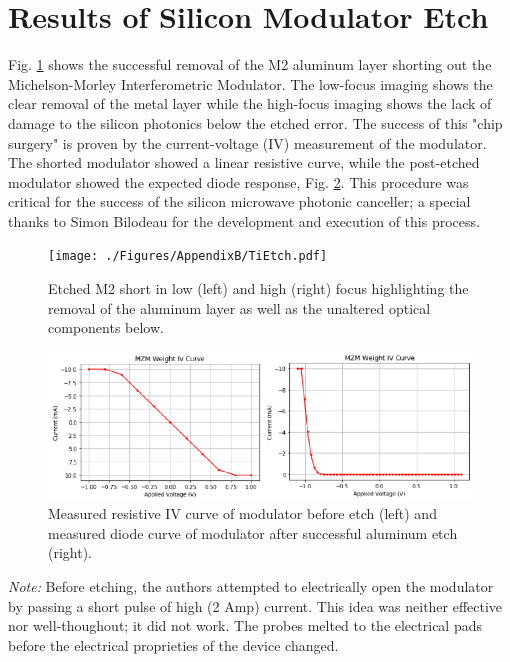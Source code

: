 \section{Results of Silicon Modulator Etch}
\qquad Fig. \ref{FigAppB4} shows the successful removal of the M2 aluminum layer shorting out the Michelson-Morley Interferometric Modulator. The low-focus imaging shows the clear removal of the metal layer while the high-focus imaging shows the lack of damage to the silicon photonics below the etched error. The success of this "chip surgery" is proven by the current-voltage (IV) measurement of the modulator. The shorted modulator showed a linear resistive curve, while the post-etched modulator showed the expected diode response, Fig. \ref{FigAppB5}. This procedure was critical for the success of the silicon microwave photonic canceller; a special thanks to Simon Bilodeau for the development and execution of this process. 

\begin{figure}[!htbp]
\centering
\texttt{[image: ./Figures/AppendixB/TiEtch.pdf]}
\caption[Imaging of successful etch in varying imaging focus to highlight different chip depths.]{Etched M2 short in low (left) and high (right) focus highlighting the removal of the aluminum layer as well as the unaltered optical components below.}
\label{FigAppB4}
\end{figure}

\begin{figure}[!htbp]
\centering
\includegraphics[width=5.5in]{./Figures/AppendixB/IVetch.pdf}
\caption[Experimental data confirming successful etch.]{Measured resistive IV curve of modulator before etch (left) and measured diode curve of modulator after successful aluminum etch (right).}
\label{FigAppB5}
\end{figure}

\qquad \textit{Note:} Before etching, the authors attempted to electrically open the modulator by passing a short pulse of high (2 Amp) current. This idea was neither effective nor well-thoughout; it did not work. The probes melted to the electrical pads before the electrical proprieties of the device changed. 
